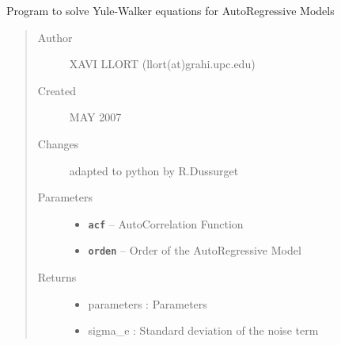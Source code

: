 \documentclass[letterpaper,10pt,english]{sphinxmanual}
\begin{document}
\begin{fulllineitems}
\label{altimetry.tools.spectrum:altimetry.tools.spectrum.yule_walker}
Program to solve Yule-Walker equations for AutoRegressive Models
\begin{quote}\begin{description}
\item[{Author}] \leavevmode
XAVI LLORT (llort(at)grahi.upc.edu)

\item[{Created}] \leavevmode
MAY 2007

\item[{Changes}] \leavevmode
adapted to python by R.Dussurget

\item[{Parameters}] \leavevmode\begin{itemize}
\item {} 
\textbf{\texttt{acf}} -- AutoCorrelation Function

\item {} 
\textbf{\texttt{orden}} -- Order of the AutoRegressive Model

\end{itemize}

\item[{Returns}] \leavevmode
\begin{itemize}
\item {} 
parameters : Parameters

\item {} 
sigma\_e : Standard deviation of the noise term

\end{itemize}


\end{description}\end{quote}

\end{fulllineitems}

\end{document}
